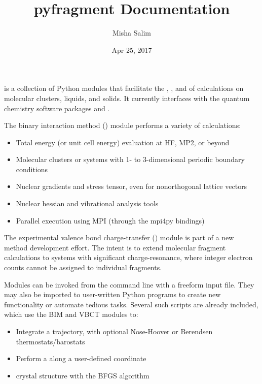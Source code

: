 \documentclass[letterpaper,10pt,english]{sphinxmanual}
\title{pyfragment Documentation}
\date{Apr 25, 2017}
\author{Misha Salim}
\begin{document}
\maketitle
\sphinxtableofcontents
{}\label{\detokenize{index::doc}}


 is a collection of Python
modules that facilitate the , , and 
of  calculations on molecular clusters, liquids, and solids.
It currently interfaces with the quantum chemistry software packages  and .

The binary interaction method () module performs a variety of
calculations:
\begin{itemize}
\item {} 
Total energy (or unit cell energy) evaluation at HF, MP2, or beyond

\item {} 
Molecular clusters or systems with 1- to 3-dimensional periodic boundary conditions

\item {} 
Nuclear gradients and stress tensor, even for nonorthogonal lattice vectors

\item {} 
Nuclear hessian and vibrational analysis tools

\item {} 
Parallel execution using MPI (through the mpi4py bindings)

\end{itemize}

The experimental valence bond charge-transfer () module is part of a new
method development effort. The intent is to extend molecular fragment
calculations to systems with significant charge-resonance, where integer
electron counts cannot be assigned to individual fragments.

Modules can be invoked from the command line with a freeform input file.  They may also be imported to user-written Python programs to
create new functionality or automate tedious tasks. Several such  scripts
are already included, which use the BIM and VBCT modules to:
\begin{itemize}
\item {} 
Integrate a  trajectory, with optional Nose-Hoover or Berendsen
thermostats/barostats

\item {} 
Perform a  along a user-defined coordinate

\item {} 
 crystal structure with the BFGS algorithm

\end{itemize}
\end{document}
